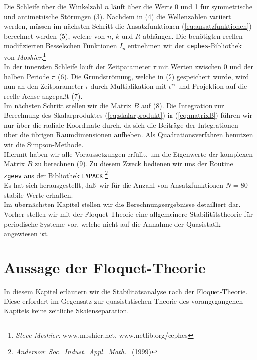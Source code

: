 \documentclass[10pt,a5paper,oneside,draft]{book}
\numberwithin{equation}{chapter}
\begin{document}
Die Schleife \"uber die Winkelzahl $n$ l\"auft \"uber die Werte 0 und 1 f\"ur symmetrische und antimetrische St\"orungen (3).
Nachdem in (4) die Wellenzahlen variiert werden, m\"ussen im n\"achsten Schritt die Ansatzfunktionen (\mbox{\ref{eq:ansatzfunktionen}}) berechnet werden (5), welche von $n$, $k$ und $R$ abh\"angen.
Die ben\"otigten reellen modifizierten Besselschen Funktionen $I_n$ entnehmen wir der \texttt{cephes}-Bibliothek von \textsl{Moshier}.\footnote{\label{bib:moshier}\textsl{Steve Moshier:} www.moshier.net, www.netlib.org/cephes}\\
In der innersten Schleife l\"auft der Zeitparameter $\tau$ mit Werten zwischen 0 und der halben Periode $\pi$ (6).
Die Grundstr\"omung, welche in (2) gespeichert wurde, wird nun an den Zeitparameter $\tau$ durch Multiplikation mit $e^{i\tau}$ und Projektion auf die reelle Achse angepa\ss t (7).\\
Im n\"achsten Schritt stellen wir die Matrix $B$ auf (8).
Die Integration zur Berechnung des Skalarproduktes (\mbox{\ref{eq:skalarprodukt}}) in (\mbox{\ref{eq:matrixB}}) f\"uhren wir nur \"uber die radiale Koordinate durch, da sich die Beitr\"age der Integrationen \"uber die \"ubrigen Raumdimensionen aufheben.
Als Quadrationsverfahren benutzen wir die Simpson-Methode.\\
Hiermit haben wir alle Voraussetzungen erf\"ullt, um die Eigenwerte der komplexen Matrix $B$ zu berechnen (9).
Zu diesem Zweck bedienen wir uns der Routine \texttt{zgeev} aus der Bibliothek \texttt{LAPACK}.\footnote{\label{bib:lapack}\textsl{Anderson}: \textit{Soc.\ Indust.\ Appl.\ Math.\ } (1999)}\\
Es hat sich herausgestellt, da\ss\ wir f\"ur die Anzahl von Ansatzfunktionen $N=80$ stabile Werte erhalten.\\

Im \"ubern\"achsten Kapitel stellen wir die Berechnungsergebnisse detailliert dar.
Vorher stellen wir mit der Floquet-\!Theorie eine allgemeinere Stabilit\"atstheorie f\"ur periodische Systeme vor, welche nicht auf die Annahme der Quasistatik angewiesen ist.

\chapter{Aussage der Floquet-\!Theorie}\label{sec:floquet}
In diesem Kapitel erl\"autern wir die Stabilit\"atsanalyse nach der Floquet-\!Theorie.
Diese erfordert im Gegensatz zur quasistatischen Theorie des vorangegangenen Kapitels keine zeitliche Skalenseparation.\\
\end{document}
